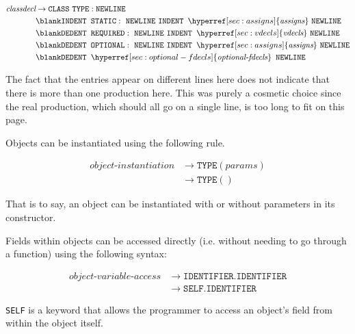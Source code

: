 \documentclass{article}
\begin{document}
\label{sec:classdecl}
\begin{align*}
    \textit{classdecl} &\to \texttt{CLASS} \text{ } \texttt{TYPE}: \texttt{NEWLINE} \text{ } \\
    &\blank \texttt{INDENT} \texttt{ } \texttt{STATIC}: \text{ } \texttt{NEWLINE}  \text{ } \texttt{INDENT} \texttt{ } \hyperref[sec:assigns]{\textit{assigns}} \text{ } \texttt{NEWLINE} \text{ } \\
    &\blank
    \texttt{DEDENT} \texttt{ } \texttt{REQUIRED}: \text{ } \texttt{NEWLINE} \text{ } \texttt{INDENT} \texttt{ }  \hyperref[sec:vdecls]{\textit{vdecls}} \text{ } \texttt{NEWLINE} \text{ } \\
    &\blank \texttt{DEDENT} \texttt{ } \texttt{OPTIONAL}: \text{ }  \texttt{NEWLINE} \text{ } \texttt{INDENT} \texttt{ } \hyperref[sec:assigns]{\textit{assigns}} \text{ } \texttt{NEWLINE} \\
    &\blank \texttt{DEDENT} \texttt{ } \hyperref[sec:optional-fdecls]{\textit{optional-fdecls}} \texttt{ } \texttt{NEWLINE}
\end{align*}

The fact that the entries appear on different lines here does not indicate that there is more than one production here. This was purely a cosmetic choice since the real production, which should all go on a single line, is too long to fit on this page.

Objects can be instantiated using the following rule.

\label{sec:object-instantiation}
\begin{align*}
    \textit{object-instantiation} &\to \texttt{TYPE}(\hyperref[sec:params]{\textit{params}}) \\
    &\to \texttt{TYPE}()
\end{align*}

That is to say, an object can be instantiated with or without parameters in its constructor.

Fields within objects can be accessed directly (i.e. without needing to go through a function) using the following syntax:

\label{sec:object-variable-access}
\begin{align*}
    \textit{object-variable-access} &\to \texttt{IDENTIFIER}.\texttt{IDENTIFIER} \\
    &\to \texttt{SELF}.\texttt{IDENTIFIER}
\end{align*}

\texttt{SELF} is a keyword that allows the programmer to access an object's field from within the object itself.
\end{document}
